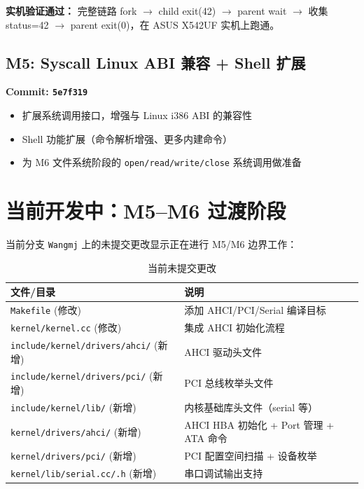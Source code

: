 \documentclass[12pt,a4paper]{article}
\begin{document}
\textbf{实机验证通过：} 完整链路 fork $\to$ child exit(42) $\to$ parent wait $\to$ 收集 status=42 $\to$ parent exit(0)，在 ASUS X542UF 实机上跑通。

\subsection{M5: Syscall Linux ABI 兼容 + Shell 扩展}

\textbf{Commit: \texttt{5e7f319}}

\begin{itemize}
    \item 扩展系统调用接口，增强与 Linux i386 ABI 的兼容性
    \item Shell 功能扩展（命令解析增强、更多内建命令）
    \item 为 M6 文件系统阶段的 \texttt{open/read/write/close} 系统调用做准备
\end{itemize}

\section{当前开发中：M5--M6 过渡阶段}

当前分支 \texttt{Wangmj} 上的未提交更改显示正在进行 M5/M6 边界工作：

\begin{table}[h]
\centering
\begin{tabular}{ll}
\toprule
\textbf{文件/目录} & \textbf{说明} \\
\midrule
\texttt{Makefile} (修改) & 添加 AHCI/PCI/Serial 编译目标 \\
\texttt{kernel/kernel.cc} (修改) & 集成 AHCI 初始化流程 \\
\texttt{include/kernel/drivers/ahci/} (新增) & AHCI 驱动头文件 \\
\texttt{include/kernel/drivers/pci/} (新增) & PCI 总线枚举头文件 \\
\texttt{include/kernel/lib/} (新增) & 内核基础库头文件（serial 等）\\
\texttt{kernel/drivers/ahci/} (新增) & AHCI HBA 初始化 + Port 管理 + ATA 命令 \\
\texttt{kernel/drivers/pci/} (新增) & PCI 配置空间扫描 + 设备枚举 \\
\texttt{kernel/lib/serial.cc/.h} (新增) & 串口调试输出支持 \\
\bottomrule
\end{tabular}
\caption{当前未提交更改}
\end{table}
\end{document}

